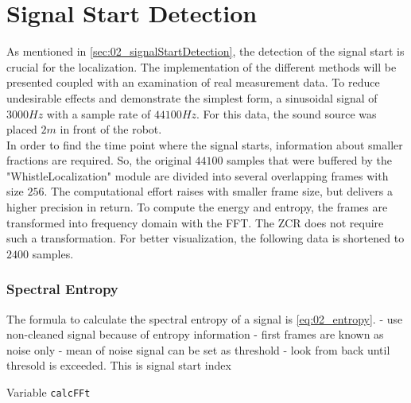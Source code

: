 \section{Signal Start Detection}
\label{sec:03_signalStartDetection}

As mentioned in \ref{sec:02_signalStartDetection}, the detection of the
signal start is crucial for the localization.
The implementation of the different methods will be presented coupled with
an examination of real measurement data.
To reduce undesirable effects and demonstrate the simplest form, a sinusoidal
signal of $3000\si{Hz}$ with a sample rate of $44100\si{Hz}$. For this
data, the sound source was placed $2\si{m}$ in front of the robot.\\
In order to find the time point where the signal starts, information about
smaller fractions are required.
So, the original $44100$ samples that were buffered by the
"WhistleLocalization" module are divided into several overlapping
frames with size $256$. The computational effort raises with smaller frame size,
but delivers a higher precision in return.
To compute the energy and entropy, the frames are transformed into
frequency domain with the \ac{FFT}.
The \ac{ZCR} does not require such a transformation.
For better visualization, the following data is shortened to $2400$ samples.


\subsubsection*{Spectral Entropy}

The formula to calculate the spectral entropy of a signal is \ref{eq:02_entropy}.
- use non-cleaned signal because of entropy information
- first frames are known as noise only
- mean of noise signal can be set as threshold
- look from back until thresold is exceeded. This is signal start index



Variable \lstinline!calcFFt!

